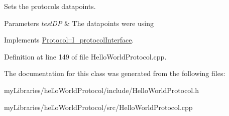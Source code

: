Sets the protocols datapoints. 


\begin{DoxyParams}{Parameters}
{\em test\+DP} & The datapoints we\textquotesingle{}re using \\
\hline
\end{DoxyParams}


Implements \mbox{\hyperlink{classProtocol_1_1I__protocolInterface_a9c44ced4f589b5e694da148128fff938}{Protocol\+::\+I\+\_\+protocol\+Interface}}.



Definition at line 149 of file Hello\+World\+Protocol.\+cpp.



The documentation for this class was generated from the following files\+:\begin{DoxyCompactItemize}
\item 
my\+Libraries/hello\+World\+Protocol/include/Hello\+World\+Protocol.\+h\item 
my\+Libraries/hello\+World\+Protocol/src/Hello\+World\+Protocol.\+cpp\end{DoxyCompactItemize}
